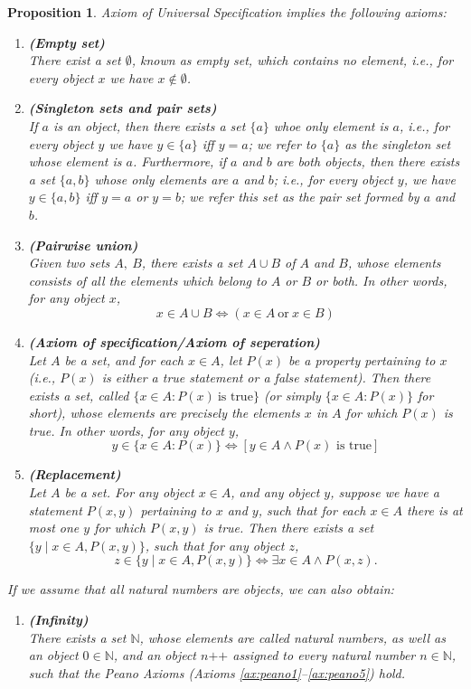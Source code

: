 \documentclass[a4paper]{book}
\theoremstyle{break}
\newtheorem{proposition}{Proposition}[section]
\begin{document}
			\begin{proposition}
				Axiom of Universal Specification implies the following axioms:
				\begin{enumerate}[label=($\alph*$)]
					\item \textbf{(Empty set)}\\
					There exist a set $\emptyset$, known as empty set, which contains no element, \textit{i.e.,} for every object $x$ we have $x\notin\emptyset$.
					\item \textbf{(Singleton sets and pair sets)}\\
					If $a$ is an object, then there exists a set $\{a\}$ whoe only element is $a$, \textit{i.e.,} for every object $y$ we have $y\in\{a\}$ iff $y=a$; we refer to $\{a\}$ as the singleton set whose element is $a$. Furthermore, if $a$ and $b$ are both objects, then there exists a set $\{a,b\}$ whose only elements are $a$ and $b$; \textit{i.e.,} for every object $y$, we have $y\in\{a,b\}$ iff $y=a$ or $y=b$; we refer this set as the pair set formed by $a$ and $b$.
					\item \textbf{(Pairwise union)}\\
					Given two sets $A,~B$, there exists a set $A\cup B$ of $A$ and $B$, whose elements consists of all the elements which belong to $A$ or $B$ or both. In other words, for any object $x$,
					$$x\in A\cup B\iff (x\in A~\textrm{or}~x\in B) $$
					\item \textbf{(Axiom of specification/Axiom of seperation)}\\
					Let $A$ be a set, and for each $x\in A$, let $P(x)$ be a property pertaining to $x$ (\textit{i.e.,} $P(x)$ is either a true statement or a false statement). Then there exists a set, called $\{x\in A:P(x)~\textrm{is~true}\}$ (or simply $\{x\in A:P(x)\}$ for short), whose elements are precisely the elements $x$ in $A$ for which $P(x)$ is true. In other words, for any object $y$, $$y\in\{x\in A:P(x)\}\iff[y\in A\land P(x)\textrm{~is~true}]$$
					\item \textbf{(Replacement)}\\
					Let $A$ be a set. For any object $x\in A$, and any object $y$, suppose we have a statement $P(x,y)$ pertaining to $x$ and $y$, such that for each $x\in A$ there is at most one $y$ for which $P(x,y)$ is true. Then there exists a set $\{y\mid x\in A,P(x,y)\}$, such that for any object $z$, $$z\in\{y\mid x\in A,P(x,y)\}\iff \exists x\in A\land P(x,z).$$
				\end{enumerate}
				If we assume that all natural numbers are objects, we can also obtain:
				\begin{enumerate}[label=($\alph*$),resume]
					\item \textbf{(Infinity)}\\
					There exists a set $\mathbb{N}$, whose elements are called natural numbers, as well as an object $0\in\mathbb{N}$, and an object $n\texttt{++}$ assigned to every natural number $n\in\mathbb{N}$, such that the Peano Axioms (Axioms \ref{ax:peano1}--\ref{ax:peano5}) hold.
				\end{enumerate}
			\end{proposition}
\end{document}

